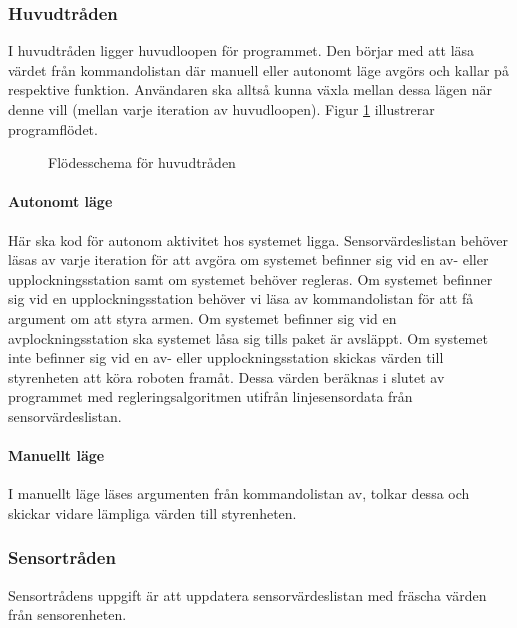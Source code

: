 \subsubsection{Huvudtråden}
I huvudtråden ligger huvudloopen för programmet. Den börjar med att läsa värdet från kommandolistan där manuell eller autonomt läge avgörs och kallar på respektive funktion. Användaren ska alltså kunna växla mellan dessa lägen när denne vill (mellan varje iteration av huvudloopen). Figur \ref{designspec:huvudmodul-huvudtrad} illustrerar programflödet.

\begin{figure}[H]
\centering
\scalebox{0.6}{}
\caption{Flödesschema för huvudtråden} \label{designspec:huvudmodul-huvudtrad}
\end{figure}

\paragraph{Autonomt läge}
\leavevmode
\newline
\newline
Här ska kod för autonom aktivitet hos systemet ligga. Sensorvärdeslistan behöver läsas av varje iteration för att avgöra om systemet befinner sig vid en av- eller upplockningsstation samt om systemet behöver regleras. Om systemet befinner sig vid en upplockningsstation behöver vi läsa av kommandolistan för att få argument om att styra armen. Om systemet befinner sig vid en avplockningsstation ska systemet låsa sig tills paket är avsläppt.
\newline 
Om systemet inte befinner sig vid en av- eller upplockningsstation skickas värden till styrenheten att köra roboten framåt. Dessa värden beräknas i slutet av programmet med regleringsalgoritmen utifrån linjesensordata från sensorvärdeslistan. 

\paragraph{Manuellt läge}
\leavevmode
\newline
\newline
I manuellt läge läses argumenten från kommandolistan av, tolkar dessa och skickar vidare lämpliga värden till styrenheten.

\subsubsection{Sensortråden}
Sensortrådens uppgift är att uppdatera sensorvärdeslistan med fräscha värden från sensorenheten.

